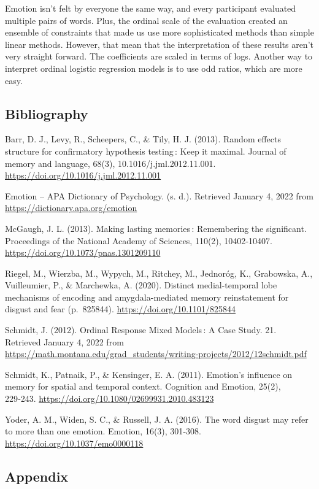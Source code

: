 \documentclass[
]{article}
\begin{document}
Emotion isn't felt by everyone the same way, and every participant
evaluated multiple pairs of words. Plus, the ordinal scale of the
evaluation created an ensemble of constraints that made us use more
sophisticated methods than simple linear methods. However, that mean
that the interpretation of these results aren't very straight forward.
The coefficients are scaled in terms of logs. Another way to interpret
ordinal logistic regression models is to use odd ratios, which are more
easy.

\hypertarget{bibliography}{%
\subsection{Bibliography}\label{bibliography}}

Barr, D. J., Levy, R., Scheepers, C., \& Tily, H. J. (2013). Random
effects structure for confirmatory hypothesis testing\,: Keep it
maximal. Journal of memory and language, 68(3),
10.1016/j.jml.2012.11.001.
\url{https://doi.org/10.1016/j.jml.2012.11.001}

Emotion -- APA Dictionary of Psychology. (s. d.). Retrieved January 4,
2022 from \url{https://dictionary.apa.org/emotion}

McGaugh, J. L. (2013). Making lasting memories\,: Remembering the
significant. Proceedings of the National Academy of Sciences, 110(2),
10402‑10407. \url{https://doi.org/10.1073/pnas.1301209110}

Riegel, M., Wierzba, M., Wypych, M., Ritchey, M., Jednoróg, K.,
Grabowska, A., Vuilleumier, P., \& Marchewka, A. (2020). Distinct
medial-temporal lobe mechanisms of encoding and amygdala-mediated memory
reinstatement for disgust and fear (p.~825844).
\url{https://doi.org/10.1101/825844}

Schmidt, J. (2012). Ordinal Response Mixed Models\,: A Case Study. 21.
Retrieved January 4, 2022 from
\url{https://math.montana.edu/grad_students/writing-projects/2012/12schmidt.pdf}

Schmidt, K., Patnaik, P., \& Kensinger, E. A. (2011). Emotion's
influence on memory for spatial and temporal context. Cognition and
Emotion, 25(2), 229‑243.
\url{https://doi.org/10.1080/02699931.2010.483123}

Yoder, A. M., Widen, S. C., \& Russell, J. A. (2016). The word disgust
may refer to more than one emotion. Emotion, 16(3), 301‑308.
\url{https://doi.org/10.1037/emo0000118}

\hypertarget{appendix}{%
\subsection{Appendix}\label{appendix}}
\end{document}
